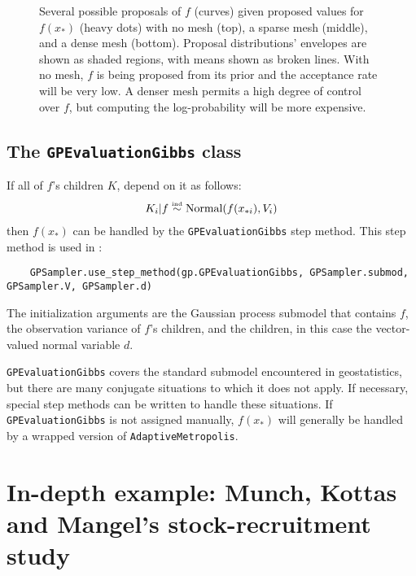\begin{figure}
    \centering
    \caption{Several possible proposals of $f$ (curves) given proposed values for $f(x_*)$ (heavy dots) with no mesh (top), a sparse mesh (middle), and a dense mesh (bottom). Proposal distributions' envelopes are shown as shaded regions, with means shown as broken lines. With no mesh, $f$ is being proposed from its prior and the acceptance rate will be very low. A denser mesh permits a high degree of control over $f$, but computing the log-probability will be more expensive.}
    \label{fig:meshpropose}
\end{figure}

\subsection{The \texttt{GPEvaluationGibbs} class} 
If all of $f$'s children $K$, depend on it as follows:
\begin{eqnarray*}
    K_i|f \stackrel{\textup{\tiny ind}}{\sim} \textup{Normal}(f(x_{*i}),V_i)
\end{eqnarray*}
then $f(x_*)$ can be handled by the \texttt{GPEvaluationGibbs} step method. This step method is used in :
\begin{verbatim}
    GPSampler.use_step_method(gp.GPEvaluationGibbs, GPSampler.submod, GPSampler.V, GPSampler.d)
\end{verbatim}
The initialization arguments are the Gaussian process submodel that contains $f$, the observation variance of $f$'s children, and the children, in this case the vector-valued normal variable $d$. 

\texttt{GPEvaluationGibbs} covers the standard submodel encountered in geostatistics, but there are many conjugate situations to which it does not apply. If necessary, special step methods can be written to handle these situations. If \texttt{GPEvaluationGibbs} is not assigned manually, $f(x_*)$ will generally be handled by a wrapped version of \texttt{AdaptiveMetropolis}.

\section{In-depth example: Munch, Kottas and Mangel's stock-recruitment study}\label{sub:MMKMCMC}

